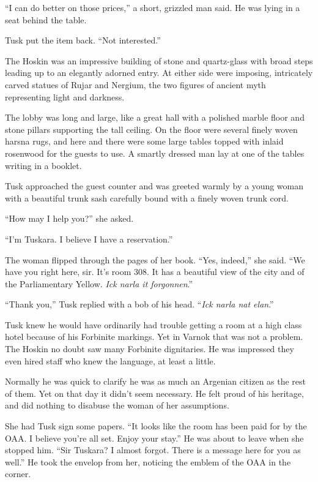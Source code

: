 ``I can do better on those prices,'' a short, grizzled man said. He was lying in a seat behind
the table.

Tusk put the item back. ``Not interested.''

The Hoskin was an impressive building of stone and quartz-glass with broad steps leading up to
an elegantly adorned entry. At either side were imposing, intricately carved statues of Rujar
and Nergium, the two figures of ancient myth representing light and darkness.

The lobby was long and large, like a great hall with a polished marble floor and stone pillars
supporting the tall ceiling. On the floor were several finely woven harsna rugs, and here and
there were some large tables topped with inlaid rosenwood for the guests to use. A smartly
dressed man lay at one of the tables writing in a booklet.

Tusk approached the guest counter and was greeted warmly by a young woman with a beautiful trunk
sash carefully bound with a finely woven trunk cord.

``How may I help you?'' she asked.

``I'm Tuskara. I believe I have a reservation.''

The woman flipped through the pages of her book. ``Yes, indeed,'' she said. ``We have you right
here, sir. It's room 308. It has a beautiful view of the city and of the Parliamentary Yellow.
\textit{Ick narla it forgonnen}.''

``Thank you,'' Tusk replied with a bob of his head. ``\textit{Ick narla nat elan}.''

Tusk knew he would have ordinarily had trouble getting a room at a high class hotel because of
his Forbinite markings. Yet in Varnok that was not a problem. The Hoskin no doubt saw many
Forbinite dignitaries. He was impressed they even hired staff who knew the language, at least a
little.

Normally he was quick to clarify he was as much an Argenian citizen as the rest of them. Yet on
that day it didn't seem necessary. He felt proud of his heritage, and did nothing to disabuse
the woman of her assumptions.

She had Tusk sign some papers. ``It looks like the room has been paid for by the OAA. I believe
you're all set. Enjoy your stay.'' He was about to leave when she stopped him. ``Sir Tuskara? I
almost forgot. There is a message here for you as well.'' He took the envelop from her, noticing
the emblem of the OAA in the corner.

